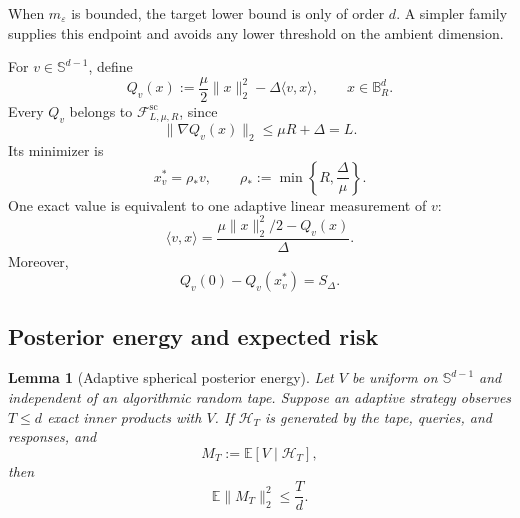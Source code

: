 \documentclass[11pt]{article}
\newcommand{\E}{\mathbb{E}}
\newcommand{\B}{\mathbb{B}}
\newcommand{\Sph}{\mathbb{S}}
\newcommand{\cF}{\mathcal{F}}
\newcommand{\eps}{\varepsilon}
\newcommand{\inner}[2]{\langle #1,#2\rangle}
\newcommand{\norm}[1]{\lVert #1\rVert_2}
\theoremstyle{plain}
\newtheorem{lemma}[lemma]{Lemma}
\theoremstyle{definition}
\begin{document}
When $m_\eps$ is bounded, the target lower bound is only of order
$d$. A simpler family supplies this endpoint and avoids any lower
threshold on the ambient dimension.

For $v\in\Sph^{d-1}$, define
\begin{equation}\label{eq:spherical-family}
   Q_v(x):=\frac{\mu}{2}\norm{x}^2-\Delta\inner{v}{x},
   \qquad x\in\B_R^d.
\end{equation}
Every $Q_v$ belongs to $\cF^{\mathrm{sc}}_{L,\mu,R}$, since
\[
  \norm{\nabla Q_v(x)}\le\mu R+\Delta=L.
\]
Its minimizer is
\begin{equation}\label{eq:spherical-minimizer}
  x_v^*=\rho_*v,
  \qquad
  \rho_*:=\min\left\{R,\frac{\Delta}{\mu}\right\}.
\end{equation}
One exact value is equivalent to one adaptive linear measurement of $v$:
\begin{equation}\label{eq:linear-measurement}
  \inner{v}{x}=\frac{\mu\norm{x}^2/2-Q_v(x)}{\Delta}.
\end{equation}
Moreover,
\[
   Q_v(0)-Q_v(x_v^*)=S_\Delta.
\]

\subsection{Posterior energy and expected risk}

\begin{lemma}[Adaptive spherical posterior energy]\label{lem:spherical-energy}
Let $V$ be uniform on $\Sph^{d-1}$ and independent of an algorithmic random tape.  Suppose an adaptive strategy observes $T\le d$ exact inner products with $V$.  If $\mathcal H_T$ is generated by the tape, queries, and responses, and
\[
   M_T:=\E[V\mid\mathcal H_T],
\]
then
\begin{equation}\label{eq:spherical-energy}
   \E\norm{M_T}^2\le\frac{T}{d}.
\end{equation}
\end{lemma}
\end{document}
